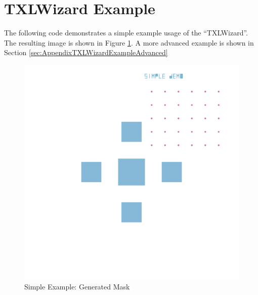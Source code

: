 \section{TXLWizard Example}
The following code demonstrates a simple example usage of the ``TXLWizard''.
The resulting image is shown in Figure \ref{fig:TXLWizardSimpleExample}.
A more advanced example is shown in Section \ref{sec:AppendixTXLWizardExampleAdvanced}



\begin{figure}[!htbp]
    \centering
     \includegraphics[width=\textwidth]{Content/Masks/EM160509_Demo_Simple.pdf}
    \caption{Simple Example: Generated Mask}
    \label{fig:TXLWizardSimpleExample}
\end{figure}